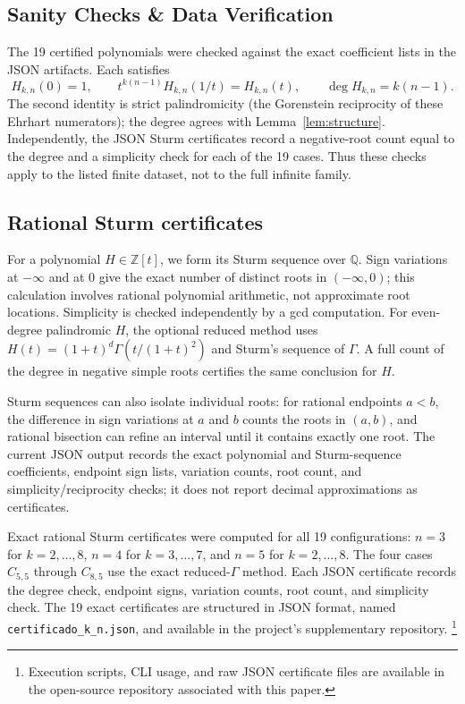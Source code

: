 \documentclass[11pt,a4paper]{article}
\theoremstyle{definition}
\begin{document}
\subsection{Sanity Checks \& Data Verification}

The 19 certified polynomials were checked against the exact coefficient
lists in the JSON artifacts. Each satisfies
\[
H_{k,n}(0)=1,\qquad
t^{k(n-1)}H_{k,n}(1/t)=H_{k,n}(t),\qquad
\deg H_{k,n}=k(n-1).
\]
The second identity is strict palindromicity (the Gorenstein reciprocity
of these Ehrhart numerators); the degree agrees with
Lemma~\ref{lem:structure}. Independently, the JSON Sturm certificates
record a negative-root count equal to the degree and a simplicity check
for each of the 19 cases. Thus these checks apply to the listed finite
dataset, not to the full infinite family.

\subsection{Rational Sturm certificates}

For a polynomial $H\in\mathbb{Z}[t]$, we form its Sturm sequence over $\mathbb{Q}$. Sign variations at $-\infty$ and at $0$ give the exact number of distinct roots in $(-\infty,0)$; this calculation involves rational polynomial arithmetic, not approximate root locations. Simplicity is checked independently by a gcd computation. For even-degree palindromic $H$, the optional reduced method uses $H(t)=(1+t)^d\Gamma(t/(1+t)^2)$ and Sturm's sequence of $\Gamma$. A full count of the degree in negative simple roots certifies the same conclusion for $H$.

Sturm sequences can also isolate individual roots: for rational endpoints $a<b$, the difference in sign variations at $a$ and $b$ counts the roots in $(a,b)$, and rational bisection can refine an interval until it contains exactly one root. The current JSON output records the exact polynomial and Sturm-sequence coefficients, endpoint sign lists, variation counts, root count, and simplicity/reciprocity checks; it does not report decimal approximations as certificates.

Exact rational Sturm certificates were computed for all 19 configurations:
$n=3$ for $k=2,\ldots,8$, $n=4$ for $k=3,\ldots,7$, and $n=5$ for
$k=2,\ldots,8$. The four cases $C_{5,5}$ through $C_{8,5}$
use the exact reduced-$\Gamma$ method. Each JSON certificate records the
degree check, endpoint signs, variation counts, root count, and
simplicity check. The 19 exact certificates are
structured in JSON format, named
\texttt{certificado\_k\_n.json}, and available in the project's
supplementary repository.
\footnote{Execution scripts, CLI usage, and raw JSON certificate files are available in the open-source repository associated with this paper.}
\end{document}
